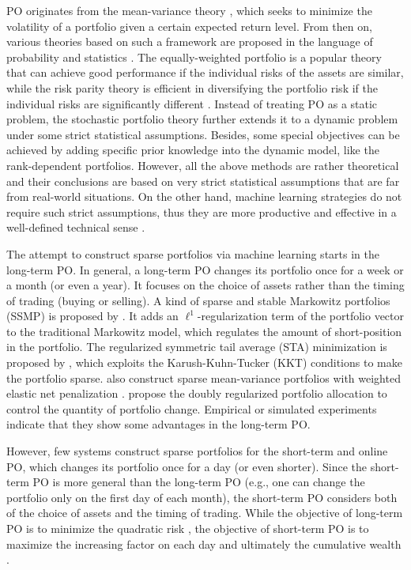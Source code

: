 \documentclass[twoside,11pt]{article}
\begin{document}
PO originates from the mean-variance theory \citep{PS}, which seeks to minimize the volatility of a portfolio given a certain expected return level. From then on, various theories based on such a framework are proposed in the language of probability and statistics \citep{CAPM,SMP,portalpha0,efficientmarket,inforatio2}. The equally-weighted portfolio is a popular theory that can achieve good performance if the individual risks of the assets are similar, while the risk parity theory is efficient in diversifying the portfolio risk if the individual risks are significantly different \citep{riskparity1}. Instead of treating PO as a static problem, the stochastic portfolio theory \citep{stoport} further extends it to a dynamic problem under some strict statistical assumptions. Besides, some special objectives can be achieved by adding specific prior knowledge into the dynamic model, like the rank-dependent portfolios. However, all the above methods are rather theoretical and their conclusions are based on very strict statistical assumptions that are far from real-world situations. On the other hand, machine learning strategies do not require such strict assumptions, thus they are more productive and effective in a well-defined technical sense \citep{olazyupdate,doubleregu,enetmeanvariance}. 



The attempt to construct sparse portfolios via machine learning starts in the long-term PO. In general, a long-term PO changes its portfolio once for a week or a month (or even a year). It focuses on the choice of assets rather than the timing of trading (buying or selling). A kind of sparse and stable Markowitz portfolios (SSMP) is proposed by \citet{sparsepo}. It adds an $\ell^1$-regularization \citep{l1mini} term of the portfolio vector to the traditional Markowitz model, which regulates the amount of short-position in the portfolio. The regularized symmetric tail average (STA) minimization is proposed by \citet{regpo}, which exploits the Karush-Kuhn-Tucker (KKT) conditions \citep{nonlinprog} to make the portfolio sparse. \citet{enetmeanvariance} also construct sparse mean-variance portfolios with weighted elastic net penalization \citep{elasticnet}. \citet{doubleregu} propose the doubly regularized portfolio allocation to control the quantity of portfolio change. Empirical or simulated experiments indicate that they show some advantages in the long-term PO.

However, few systems construct sparse portfolios for the short-term and online PO, which changes its portfolio once for a day (or even shorter). Since the short-term PO is more general than the long-term PO (e.g., one can change the portfolio only on the first day of each month), the short-term PO considers both of the choice of assets and the timing of trading. While the objective of long-term PO is to minimize the quadratic risk \citep{PS,sparsepo,enetmeanvariance,doubleregu}, the objective of short-term PO is to maximize the increasing factor on each day and ultimately the cumulative wealth \citep{uPS1,ONS,CORN,olazyupdate,OLMAR,RMR2,olpsjmlr}.
\end{document}
